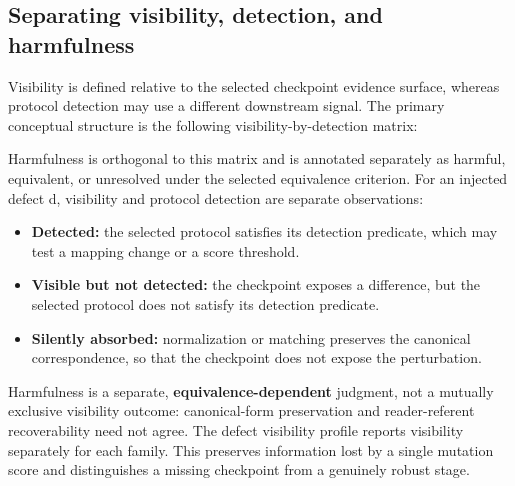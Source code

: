 \documentclass[a4paper,twoside]{article}
\begin{document}
\subsection{Separating visibility, detection, and harmfulness}
Visibility is defined relative to the selected checkpoint evidence surface, whereas protocol detection may use a different downstream signal.
The primary conceptual structure is the following visibility-by-detection matrix:
\begin{table}[htbp]
\centering
\caption{Visibility-by-detection measurement matrix.}
\small
\hfuzz=3pt
\setlength{\tabcolsep}{0.5pt}
\end{table}
Harmfulness is orthogonal to this matrix and is annotated separately as harmful, equivalent, or unresolved under the selected equivalence criterion.
For an injected defect d, visibility and protocol detection are separate observations:
\begin{itemize}
\item \textbf{Detected:} the selected protocol satisfies its detection predicate, which may test a mapping change or a score threshold.
\item \textbf{Visible but not detected:} the checkpoint exposes a difference, but the selected protocol does not satisfy its detection predicate.
\item \textbf{Silently absorbed:} normalization or matching preserves the canonical correspondence, so that the checkpoint does not expose the perturbation.
\end{itemize}
Harmfulness is a separate, \textbf{equivalence-dependent} judgment, not a mutually exclusive visibility outcome: canonical-form preservation and reader-referent recoverability need not agree.
The defect visibility profile reports visibility separately for each family. This preserves information lost by a single mutation score and distinguishes a missing checkpoint from a genuinely robust stage.
\end{document}
